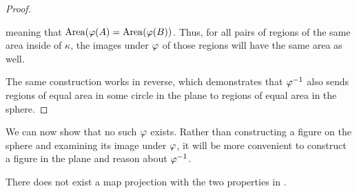 \begin{proof}
{  }

  meaning that $\mathrm{Area}(\varphi(A) = \mathrm{Area}(\varphi(B))$. 
  Thus, for all pairs of regions of the same area inside of $\kappa$,
  the images under $\varphi$ of those regions will have the same area as
  well.

  The same construction works in reverse, which demonstrates that
  $\varphi^{-1}$ also sends regions of equal area in some circle in the
  plane to regions of  equal area in the sphere.
\end{proof} 

We can now show that no such $\varphi$ exists.  Rather than constructing a figure on the sphere and examining its image under $\varphi$, it will be more convenient to construct a figure in the plane and reason about $\varphi^{-1}$.

\begin{theorem}\label{thm:reockbad}
  There does not exist a map projection with the two properties in
  .  
\end{theorem}
